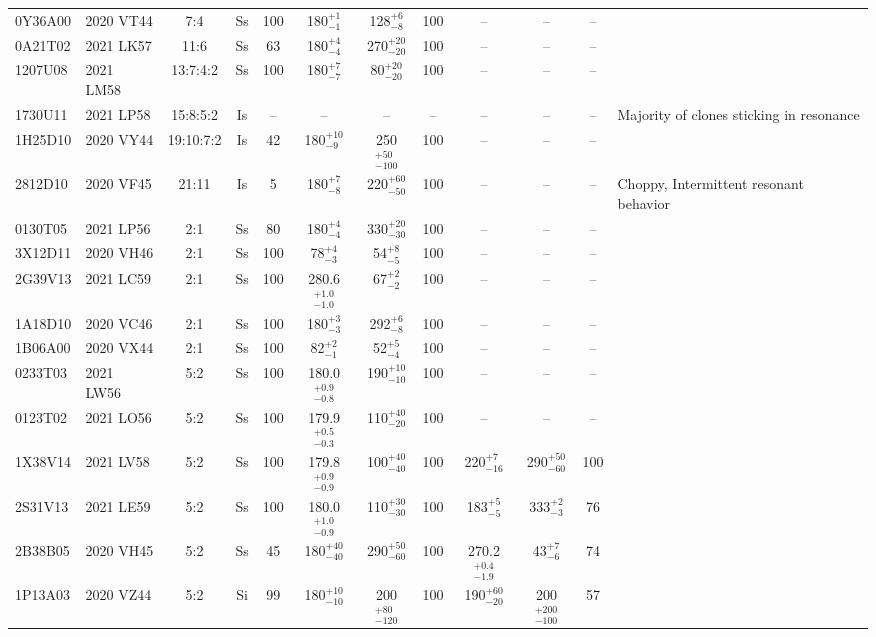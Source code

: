\begin{longrotatetable}
\begin{longtable}{ll|ccccccccc | l}
0Y36A00 & 2020 VT44 & 7:4 & Ss & 100 & 180$_{-1}^{+1}$ & 128$_{-8}^{+6}$ & 100 & -- & -- & -- & \\ 
0A21T02 & 2021 LK57 & 11:6 & Ss & 63 & 180$_{-4}^{+4}$ & 270$_{-20}^{+20}$ & 100 & -- & -- & -- & \\ 
1207U08 & 2021 LM58 & 13:7:4:2 & Ss & 100 & 180$_{-7}^{+7}$ & 80$_{-20}^{+20}$ & 100 & -- & -- & -- & \\ 
1730U11 & 2021 LP58 & 15:8:5:2 & Is & -- & -- & -- & -- & -- & -- & -- & Majority of clones sticking in resonance  \\ 
1H25D10 & 2020 VY44 & 19:10:7:2 & Is & 42 & 180$_{-9}^{+10}$ & 250$_{-100}^{+50}$ & 100 & -- & -- & -- & \\ 
2812D10 & 2020 VF45 & 21:11 & Is & 5 & 180$_{-8}^{+7}$ & 220$_{-50}^{+60}$ & 100 & -- & -- & -- & Choppy, Intermittent resonant behavior  \\ 
0130T05 & 2021 LP56 & 2:1 & Ss & 80 & 180$_{-4}^{+4}$ & 330$_{-30}^{+20}$ & 100 & -- & -- & -- & \\ 
3X12D11 & 2020 VH46 & 2:1 & Ss & 100 & 78$_{-3}^{+4}$ & 54$_{-5}^{+8}$ & 100 & -- & -- & -- & \\ 
2G39V13 & 2021 LC59 & 2:1 & Ss & 100 & 280.6$_{-1.0}^{+1.0}$ & 67$_{-2}^{+2}$ & 100 & -- & -- & -- & \\ 
1A18D10 & 2020 VC46 & 2:1 & Ss & 100 & 180$_{-3}^{+3}$ & 292$_{-8}^{+6}$ & 100 & -- & -- & -- & \\ 
1B06A00 & 2020 VX44 & 2:1 & Ss & 100 & 82$_{-1}^{+2}$ & 52$_{-4}^{+5}$ & 100 & -- & -- & -- & \\ 
0233T03 & 2021 LW56 & 5:2 & Ss & 100 & 180.0$_{-0.8}^{+0.9}$ & 190$_{-10}^{+10}$ & 100 & -- & -- & -- & \\ 
0123T02 & 2021 LO56 & 5:2 & Ss & 100 & 179.9$_{-0.3}^{+0.5}$ & 110$_{-20}^{+40}$ & 100 & -- & -- & -- & \\ 
1X38V14 & 2021 LV58 & 5:2 & Ss & 100 & 179.8$_{-0.9}^{+0.9}$ & 100$_{-40}^{+40}$ & 100 & 220$_{-16}^{+7}$ & 290$_{-60}^{+50}$ & 100 & \\ 
2S31V13 & 2021 LE59 & 5:2 & Ss & 100 & 180.0$_{-0.9}^{+1.0}$ & 110$_{-30}^{+30}$ & 100 & 183$_{-5}^{+5}$ & 333$_{-3}^{+2}$ & 76 & \\ 
2B38B05 & 2020 VH45 & 5:2 & Ss & 45 & 180$_{-40}^{+40}$ & 290$_{-60}^{+50}$ & 100 & 270.2$_{-1.9}^{+0.4}$ & 43$_{-6}^{+7}$ & 74 & \\ 
1P13A03 & 2020 VZ44 & 5:2 & Si & 99 & 180$_{-10}^{+10}$ & 200$_{-120}^{+80}$ & 100 & 190$_{-20}^{+60}$ & 200$_{-100}^{+200}$ & 57 & \\ 

\end{longtable}
\end{longrotatetable}
